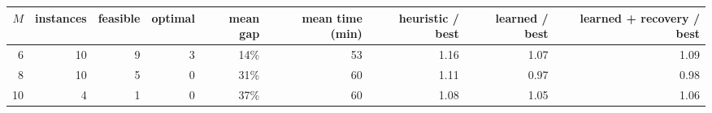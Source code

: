 \begin{tabular}{rrrrrrrrr}
\toprule
$M$ & instances & feasible & optimal & mean gap & mean time (min) & heuristic / best & learned / best & learned + recovery / best \\
\midrule
6 & 10 & 9 & 3 & 14\% & 53 & 1.16 & 1.07 & 1.09 \\
8 & 10 & 5 & 0 & 31\% & 60 & 1.11 & 0.97 & 0.98 \\
10 & 4 & 1 & 0 & 37\% & 60 & 1.08 & 1.05 & 1.06 \\
\bottomrule
\end{tabular}%
